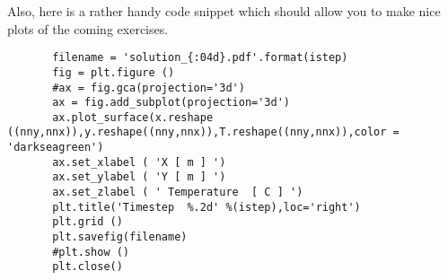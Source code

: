 Also, here is a rather handy code snippet which should allow you to make nice plots of the coming exercises.

\begin{lstlisting}
       filename = 'solution_{:04d}.pdf'.format(istep) 
       fig = plt.figure ()
       #ax = fig.gca(projection='3d')
       ax = fig.add_subplot(projection='3d')
       ax.plot_surface(x.reshape ((nny,nnx)),y.reshape((nny,nnx)),T.reshape((nny,nnx)),color = 'darkseagreen')
       ax.set_xlabel ( 'X [ m ] ')
       ax.set_ylabel ( 'Y [ m ] ')
       ax.set_zlabel ( ' Temperature  [ C ] ')
       plt.title('Timestep  %.2d' %(istep),loc='right')
       plt.grid ()
       plt.savefig(filename)
       #plt.show ()
       plt.close()
\end{lstlisting}


